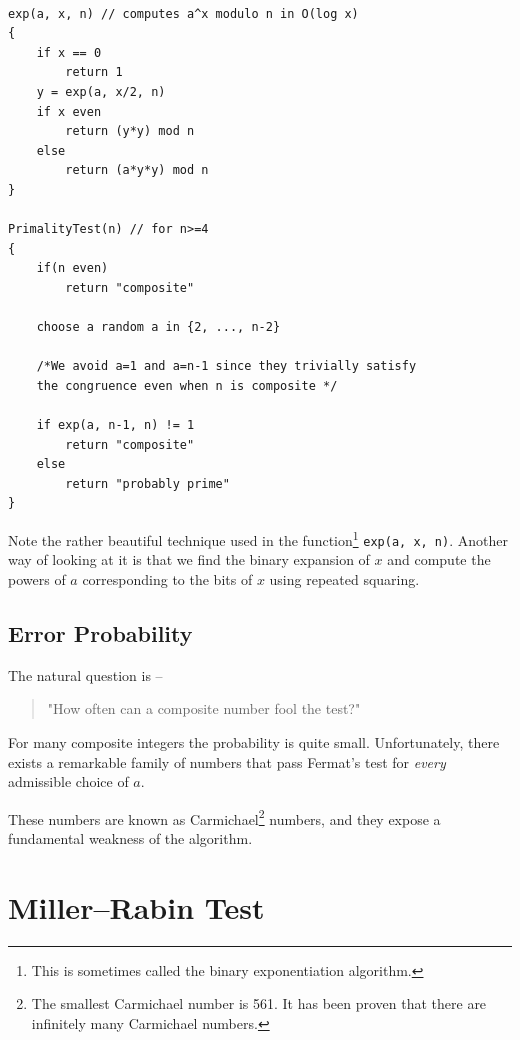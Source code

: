 \begin{center}
\begin{minipage}{0.9\linewidth}
\begin{framed}
\begin{Verbatim}[commandchars=+\[\]]

exp(a, x, n) // computes a^x modulo n in O(log x)
{
    if x == 0
        return 1
    y = exp(a, x/2, n)
    if x even
        return (y*y) mod n
    else
        return (a*y*y) mod n
}

PrimalityTest(n) // for n>=4
{
    if(n even)
        return "composite"
    
    choose a random a in {2, ..., n-2} 

    /*We avoid a=1 and a=n-1 since they trivially satisfy 
    the congruence even when n is composite */
 
    if exp(a, n-1, n) != 1
        return "composite"
    else
        return "probably prime"
}
\end{Verbatim}
\vspace{-4mm}
\end{framed}
\end{minipage}
\end{center}
Note the rather beautiful technique used in the function\footnote{This is sometimes called the binary exponentiation algorithm.}
\texttt{exp(a, x, n)}.
Another way of looking at it is that we find the binary expansion of \(x\) and compute the 
powers of \(a\) corresponding to the bits of \(x\) using repeated squaring.\\

\subsection{Error Probability}

The natural question is --
\begin{quote}
"How often can a composite number fool the test?"
\end{quote}

For many composite integers the probability is quite small. 
Unfortunately, there exists a remarkable family of numbers 
that pass Fermat's test for \emph{every} admissible choice of \(a\).

These numbers are known as Carmichael\footnote{The smallest Carmichael number is 561. It has been proven 
that there are infinitely many Carmichael numbers.} numbers, and they expose a fundamental weakness of the algorithm.

\section{Miller--Rabin Test}

